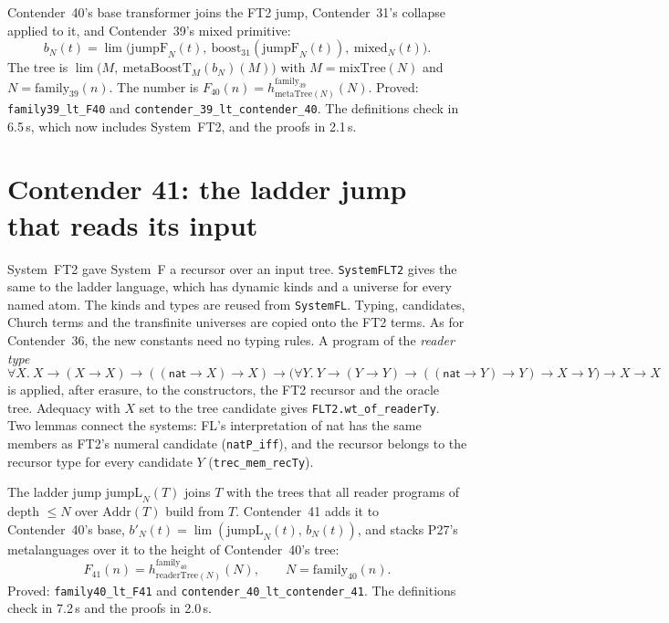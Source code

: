\documentclass[11pt]{article}
\theoremstyle{definition}
\theoremstyle{remark}
\newcommand{\lean}[1]{\texttt{#1}}
\begin{document}
Contender~40's base transformer joins the FT2 jump, Contender~31's collapse
applied to it, and Contender~39's mixed primitive:
\[
b_N(t)=\lim\bigl(\mathrm{jumpF}_N(t),\ \mathrm{boost}_{31}(\mathrm{jumpF}_N(t)),\
\mathrm{mixed}_N(t)\bigr).
\]
The tree is $\lim\bigl(M,\ \mathrm{metaBoostT}_{M}(b_N)(M)\bigr)$ with
$M=\mathrm{mixTree}(N)$ and $N=\mathrm{family}_{39}(n)$. The number is
$F_{40}(n)=h^{\mathrm{family}_{39}}_{\mathrm{metaTree}(N)}(N)$. Proved:
\lean{family39\_lt\_F40} and \lean{contender\_39\_lt\_\allowbreak contender\_40}.
The definitions check in 6.5\,s, which now includes System~FT2, and the proofs
in 2.1\,s.

\section{Contender 41: the ladder jump that reads its input}

System~FT2 gave System~F a recursor over an input tree. \lean{SystemFLT2} gives
the same to the ladder language, which has dynamic kinds and a universe for
every named atom. The kinds and types are reused from \lean{SystemFL}. Typing,
candidates, Church terms and the transfinite universes are copied onto the
FT2 terms. As for Contender~36, the new constants need no typing rules. A
program of the \emph{reader type}
\[
\forall X.\ X\to(X\to X)\to((\mathsf{nat}\to X)\to X)\to
\bigl(\forall Y.\ Y\to(Y\to Y)\to((\mathsf{nat}\to Y)\to Y)\to X\to Y\bigr)\to X\to X
\]
is applied, after erasure, to the constructors, the FT2 recursor and the oracle
tree. Adequacy with $X$ set to the tree candidate gives
\lean{FLT2.wt\_of\_readerTy}. Two lemmas connect the systems: FL's
interpretation of \textsf{nat} has the same members as FT2's numeral candidate
(\lean{natP\_iff}), and the recursor belongs to the recursor type for every
candidate $Y$ (\lean{trec\_mem\_recTy}).

The ladder jump $\mathrm{jumpL}_N(T)$ joins $T$ with the trees that all reader
programs of depth $\le N$ over $\mathrm{Addr}(T)$ build from $T$. Contender~41
adds it to Contender~40's base, $b'_N(t)=\lim(\mathrm{jumpL}_N(t),\,b_N(t))$,
and stacks P27's metalanguages over it to the height of Contender~40's tree:
\[
F_{41}(n)=h^{\mathrm{family}_{40}}_{\mathrm{readerTree}(N)}(N),\qquad N=\mathrm{family}_{40}(n).
\]
Proved: \lean{family40\_lt\_F41} and \lean{contender\_40\_lt\_\allowbreak contender\_41}.
The definitions check in 7.2\,s and the proofs in 2.0\,s.
\end{document}
